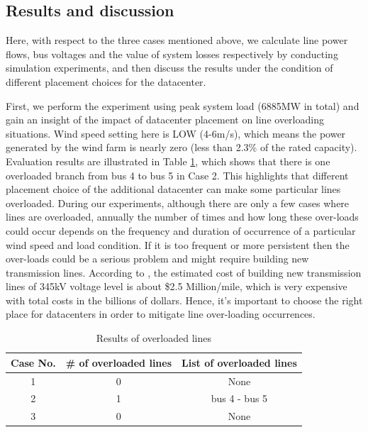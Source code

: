 \subsection{Results and discussion}

Here, with respect to the three cases mentioned above, we calculate line power flows, bus voltages and the value of system losses respectively by conducting simulation experiments, and then discuss the results under the condition of different placement choices for the datacenter.

First, we perform the experiment using peak system load (6885MW in total) and gain an insight of the impact of datacenter placement on line overloading situations. Wind speed setting here is LOW (4-6m/s), which means the power generated by the wind farm is nearly zero (less than 2.3\% of the rated capacity). Evaluation results are illustrated in Table \ref{tab:results-linevio}, which shows that there is one overloaded branch from bus 4 to bus 5 in Case 2. This highlights that different placement choice of the additional datacenter can make some particular lines overloaded. During our experiments, although there are only a few cases where lines are overloaded, annually the number of times and how long these over-loads could occur depends on the frequency and duration of occurrence of a particular wind speed and load condition. If it is too frequent or more persistent then the over-loads could be a serious problem and might require building new transmission lines. According to \cite{interconnection2010survey}, the estimated cost of building new transmission lines of 345kV voltage level is about \$2.5 Million/mile, which is very expensive with total costs in the billions of dollars. Hence, it's important to choose the right place for datacenters in order to mitigate line over-loading occurrences.


\begin{table}[ht]
\begin{center}
\caption{Results of overloaded lines}
\begin{tabular}{|c|c|c|}
\hline
Case No. & \# of overloaded lines & List of overloaded lines \\
\hline
1 & 0 & None\\
2 & 1 &  bus 4 - bus 5 \\
3 & 0 & None \\

\hline

\end{tabular}
   \vspace{.05in}
\label{tab:results-linevio}
\end{center}
\end{table}

